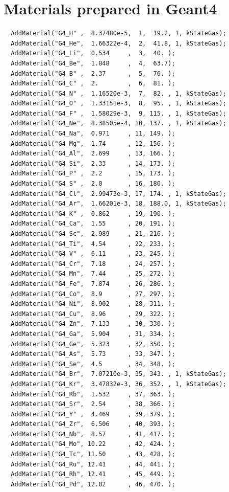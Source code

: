 \documentclass[a4paper,12pt]{article}
\begin{document}
 \section{Materials prepared in Geant4\label{app:mat}}
 \begin{verbatim}
  AddMaterial("G4_H" ,  8.37480e-5,  1,  19.2, 1, kStateGas);
  AddMaterial("G4_He",  1.66322e-4,  2,  41.8, 1, kStateGas);
  AddMaterial("G4_Li",  0.534     ,  3,  40. );
  AddMaterial("G4_Be",  1.848     ,  4,  63.7);
  AddMaterial("G4_B" ,  2.37      ,  5,  76. );
  AddMaterial("G4_C" ,  2.        ,  6,  81. );
  AddMaterial("G4_N" ,  1.16520e-3,  7,  82. , 1, kStateGas);
  AddMaterial("G4_O" ,  1.33151e-3,  8,  95. , 1, kStateGas);
  AddMaterial("G4_F" ,  1.58029e-3,  9, 115. , 1, kStateGas);
  AddMaterial("G4_Ne",  8.38505e-4, 10, 137. , 1, kStateGas);
  AddMaterial("G4_Na",  0.971     , 11, 149. );
  AddMaterial("G4_Mg",  1.74      , 12, 156. );
  AddMaterial("G4_Al",  2.699     , 13, 166. );
  AddMaterial("G4_Si",  2.33      , 14, 173. );
  AddMaterial("G4_P" ,  2.2       , 15, 173. );
  AddMaterial("G4_S" ,  2.0       , 16, 180. );
  AddMaterial("G4_Cl",  2.99473e-3, 17, 174. , 1, kStateGas);
  AddMaterial("G4_Ar",  1.66201e-3, 18, 188.0, 1, kStateGas);
  AddMaterial("G4_K" ,  0.862     , 19, 190. );
  AddMaterial("G4_Ca",  1.55      , 20, 191. );
  AddMaterial("G4_Sc",  2.989     , 21, 216. );
  AddMaterial("G4_Ti",  4.54      , 22, 233. );
  AddMaterial("G4_V" ,  6.11      , 23, 245. );
  AddMaterial("G4_Cr",  7.18      , 24, 257. );
  AddMaterial("G4_Mn",  7.44      , 25, 272. );
  AddMaterial("G4_Fe",  7.874     , 26, 286. );
  AddMaterial("G4_Co",  8.9       , 27, 297. );
  AddMaterial("G4_Ni",  8.902     , 28, 311. );
  AddMaterial("G4_Cu",  8.96      , 29, 322. );
  AddMaterial("G4_Zn",  7.133     , 30, 330. );
  AddMaterial("G4_Ga",  5.904     , 31, 334. );
  AddMaterial("G4_Ge",  5.323     , 32, 350. );
  AddMaterial("G4_As",  5.73      , 33, 347. );
  AddMaterial("G4_Se",  4.5       , 34, 348. );
  AddMaterial("G4_Br",  7.07210e-3, 35, 343. , 1, kStateGas);
  AddMaterial("G4_Kr",  3.47832e-3, 36, 352. , 1, kStateGas);
  AddMaterial("G4_Rb",  1.532     , 37, 363. );
  AddMaterial("G4_Sr",  2.54      , 38, 366. );
  AddMaterial("G4_Y" ,  4.469     , 39, 379. );
  AddMaterial("G4_Zr",  6.506     , 40, 393. );
  AddMaterial("G4_Nb",  8.57      , 41, 417. );
  AddMaterial("G4_Mo", 10.22      , 42, 424. );
  AddMaterial("G4_Tc", 11.50      , 43, 428. );
  AddMaterial("G4_Ru", 12.41      , 44, 441. );
  AddMaterial("G4_Rh", 12.41      , 45, 449. );
  AddMaterial("G4_Pd", 12.02      , 46, 470. );

\end{verbatim}
\end{document}
